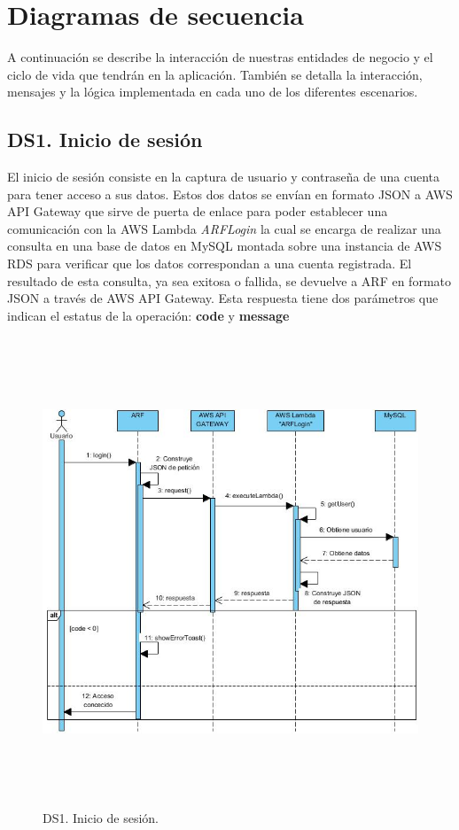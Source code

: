 \newpage
\section{Diagramas de secuencia}
A continuación se describe la interacción de nuestras entidades de negocio y el ciclo de vida que tendrán en la aplicación. También se detalla la interacción, mensajes y la lógica implementada en cada uno de los diferentes escenarios.\par

\subsection{DS1. Inicio de sesión}
El inicio de sesión consiste en la captura de usuario y contraseña de una cuenta para tener acceso a sus datos. Estos dos datos se envían en formato JSON a AWS API Gateway que sirve de puerta de enlace para poder establecer una comunicación con la AWS Lambda \textit{ARFLogin} la cual se encarga de realizar una consulta en una base de datos en MySQL montada sobre una instancia de AWS RDS para verificar que los datos correspondan a una cuenta registrada. El resultado de esta consulta, ya sea exitosa o fallida, se devuelve a ARF en formato JSON a través de AWS API Gateway. Esta respuesta tiene dos parámetros que indican el estatus de la operación: \textbf{code} y \textbf{message}

\begin{figure}[h!]
	\centering
	\includegraphics[width=14cm,height=14cm]{imagenes/analisis/ds/dsinicio_sesion.jpg}
	\caption{DS1. Inicio de sesión.}
	\label{fig:dsiniciosesion}
\end{figure}

